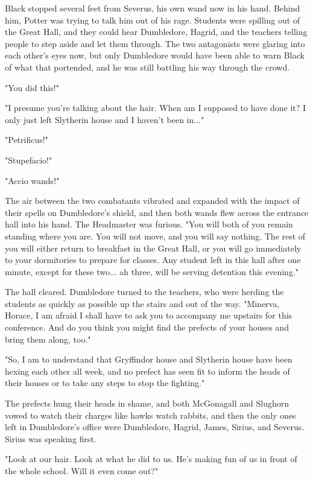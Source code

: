 \documentclass[a4paper,11pt]{article}
\begin{document}
Black stopped several feet from Severus, his own wand now in his hand. Behind him, Potter was trying to talk him out of his rage. Students were spilling out of the Great Hall, and they could hear Dumbledore, Hagrid, and the teachers telling people to step aside and let them through. The two antagonists were glaring into each other's eyes now, but only Dumbledore would have been able to warn Black of what that portended, and he was still battling his way through the crowd.

"You did this!"

"I presume you're talking about the hair. When am I supposed to have done it? I only just left Slytherin house and I haven't been in..."

"Petrificus!"

"Stupefacio!"

"Accio wands!"

The air between the two combatants vibrated and expanded with the impact of their spells on Dumbledore's shield, and then both wands flew across the entrance hall into his hand. The Headmaster was furious. "You will both of you remain standing where you are. You will not move, and you will say nothing. The rest of you will either return to breakfast in the Great Hall, or you will go immediately to your dormitories to prepare for classes. Any student left in this hall after one minute, except for these two... ah three, will be serving detention this evening."

The hall cleared. Dumbledore turned to the teachers, who were herding the students as quickly as possible up the stairs and out of the way. "Minerva, Horace, I am afraid I shall have to ask you to accompany me upstairs for this conference. And do you think you might find the prefects of your houses and bring them along, too."

"So, I am to understand that Gryffindor house and Slytherin house have been hexing each other all week, and no prefect has seen fit to inform the heads of their houses or to take any steps to stop the fighting."

The prefects hung their heads in shame, and both McGonagall and Slughorn vowed to watch their charges like hawks watch rabbits, and then the only ones left in Dumbledore's office were Dumbledore, Hagrid, James, Sirius, and Severus. Sirius was speaking first.

"Look at our hair. Look at what he did to us. He's making fun of us in front of the whole school. Will it even come out?"
\end{document}
